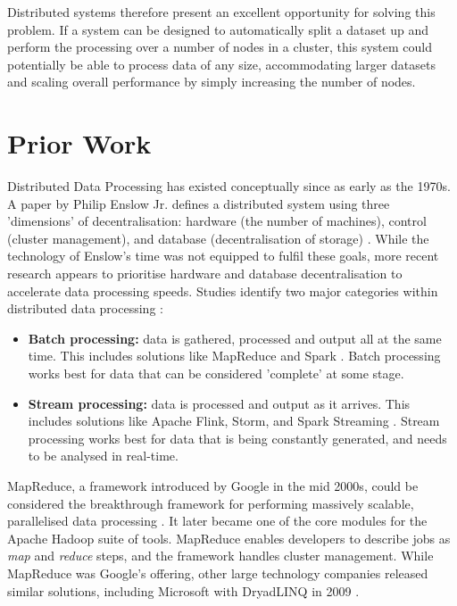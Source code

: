 Distributed systems therefore present an excellent opportunity for solving this problem. If a system can be designed to automatically split a dataset up and perform the processing over a number of nodes in a cluster, this system could potentially be able to process data of any size, accommodating larger datasets  and scaling overall performance by simply increasing the number of nodes.

\section{Prior Work}
Distributed Data Processing has existed conceptually since as early as the 1970s. A paper by Philip Enslow Jr{\frenchspacing.} defines a distributed system using three 'dimensions' of decentralisation: hardware (the number of machines), control (cluster management), and database (decentralisation of storage) \cite{enslow1978distributed}. While the technology of Enslow's time was not equipped to fulfil these goals, more recent research appears to prioritise hardware and database decentralisation to accelerate data processing speeds. Studies identify two major categories within distributed data processing \cite{yaqoob2016big}:
\begin{itemize}
	\item \textbf{Batch processing:} data is gathered, processed and output all at the same time. This includes solutions like MapReduce and Spark \cite{dean2008mapreduce, zaharia2016spark}. Batch processing works best for data that can be considered 'complete' at some stage.
	\item \textbf{Stream processing:} data is processed and output as it arrives. This includes solutions like Apache Flink, Storm, and Spark Streaming \cite{carbone2015flink, toshniwal2014storm, armbrust2018sparkstreaming}. Stream processing works best for data that is being constantly generated, and needs to be analysed in real-time.
\end{itemize}

MapReduce, a framework introduced by Google in the mid 2000s, could be considered the breakthrough framework for performing massively scalable, parallelised data processing \cite{dean2008mapreduce}. It later became one of the core modules for the Apache Hadoop suite of tools. MapReduce enables developers to describe jobs as \textit{map} and \textit{reduce} steps, and the framework handles cluster management. While MapReduce was Google's offering, other large technology companies released similar solutions, including Microsoft with DryadLINQ in 2009 \cite{fetterly2009dryadlinq}.

